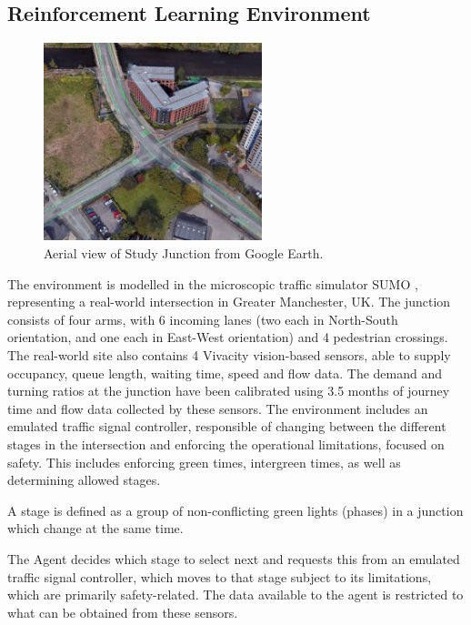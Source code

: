 \documentclass[conference]{IEEEtran}
\begin{document}
\subsection{Reinforcement Learning Environment}
\begin{figure}                                                
\centering                                                    
\includegraphics[width=2.5in]{gmaps_iso_censored.jpg}                                    
\caption{Aerial view of Study Junction from Google Earth.}                                  
\label{intersection}                                               
\end{figure}
The environment is modelled in the microscopic traffic simulator SUMO \cite{sumo}, representing a real-world intersection in Greater Manchester, UK.
The junction consists of four arms, with 6 incoming lanes (two each in North-South orientation, and one each in East-West orientation) and 4 pedestrian crossings.
The real-world site also contains 4 Vivacity vision-based sensors, able to supply occupancy, queue length, waiting time, speed and flow data.
The demand and turning ratios at the junction have been calibrated using 3.5 months of journey time and flow data collected by these sensors.
The environment includes an emulated traffic signal controller, responsible of changing between the different stages in the intersection and enforcing the operational limitations, focused on safety.
This includes enforcing green times, intergreen times, as well as determining allowed stages.  

A stage is defined as a group of non-conflicting green lights (phases) in a junction which change at the same time.

The Agent decides which stage to select next and requests this from an emulated traffic signal controller, which moves to that stage subject to its limitations, which are primarily safety-related.
The data available to the agent is restricted to what can be obtained from these sensors.     
\end{document}
